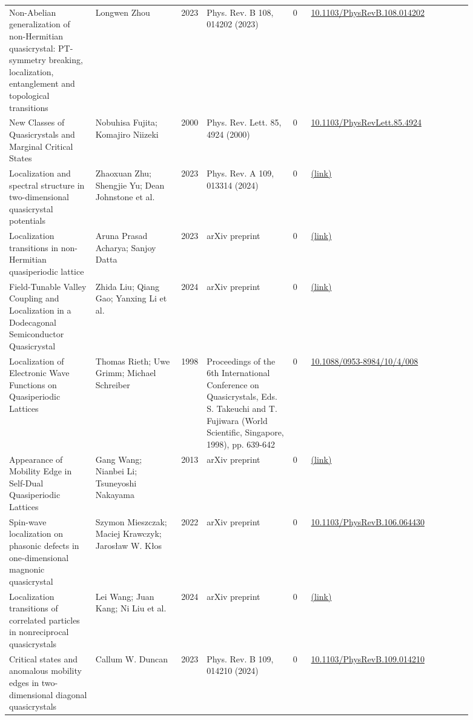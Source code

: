\documentclass[10pt,a4paper]{article}
\begin{document}
{\begin{longtable}{p{0.192\linewidth}p{0.192\linewidth}p{0.043\linewidth}p{0.192\linewidth}p{0.043\linewidth}p{0.132\linewidth}p{0.096\linewidth}}
Non-Abelian generalization of non-Hermitian quasicrystal: PT-symmetry breaking, localization, entanglement and topological transitions & Longwen Zhou & 2023 & Phys. Rev. B 108, 014202 (2023) & 0 & \href{https://doi.org/10.1103/PhysRevB.108.014202}{10.1103/PhysRevB.108.014202} &  \\
New Classes of Quasicrystals and Marginal Critical States & Nobuhisa Fujita; Komajiro Niizeki & 2000 & Phys. Rev. Lett. 85, 4924 (2000) & 0 & \href{https://doi.org/10.1103/PhysRevLett.85.4924}{10.1103/PhysRevLett.85.4924} &  \\
Localization and spectral structure in two-dimensional quasicrystal potentials & Zhaoxuan Zhu; Shengjie Yu; Dean Johnstone et al. & 2023 & Phys. Rev. A 109, 013314 (2024) & 0 & \href{http://arxiv.org/abs/2307.09527v2}{(link)} &  \\
Localization transitions in non-Hermitian quasiperiodic lattice & Aruna Prasad Acharya; Sanjoy Datta & 2023 & arXiv preprint & 0 & \href{http://arxiv.org/abs/2306.09036v1}{(link)} &  \\
Field-Tunable Valley Coupling and Localization in a Dodecagonal Semiconductor Quasicrystal & Zhida Liu; Qiang Gao; Yanxing Li et al. & 2024 & arXiv preprint & 0 & \href{http://arxiv.org/abs/2408.02176v1}{(link)} &  \\
Localization of Electronic Wave Functions on Quasiperiodic Lattices & Thomas Rieth; Uwe Grimm; Michael Schreiber & 1998 & Proceedings of the 6th International Conference on Quasicrystals, Eds. S. Takeuchi and T. Fujiwara (World Scientific, Singapore, 1998), pp. 639-642 & 0 & \href{https://doi.org/10.1088/0953-8984/10/4/008}{10.1088/0953-8984/10/4/008} &  \\
Appearance of Mobility Edge in Self-Dual Quasiperiodic Lattices & Gang Wang; Nianbei Li; Tsuneyoshi Nakayama & 2013 & arXiv preprint & 0 & \href{http://arxiv.org/abs/1312.0844v1}{(link)} &  \\
Spin-wave localization on phasonic defects in one-dimensional magnonic quasicrystal & Szymon Mieszczak; Maciej Krawczyk; Jarosław W. Kłos & 2022 & arXiv preprint & 0 & \href{https://doi.org/10.1103/PhysRevB.106.064430}{10.1103/PhysRevB.106.064430} &  \\
Localization transitions of correlated particles in nonreciprocal quasicrystals & Lei Wang; Juan Kang; Ni Liu et al. & 2024 & arXiv preprint & 0 & \href{http://arxiv.org/abs/2412.18755v1}{(link)} &  \\
Critical states and anomalous mobility edges in two-dimensional diagonal quasicrystals & Callum W. Duncan & 2023 & Phys. Rev. B 109, 014210 (2024) & 0 & \href{https://doi.org/10.1103/PhysRevB.109.014210}{10.1103/PhysRevB.109.014210} &  \\

\end{longtable}}
\end{document}
